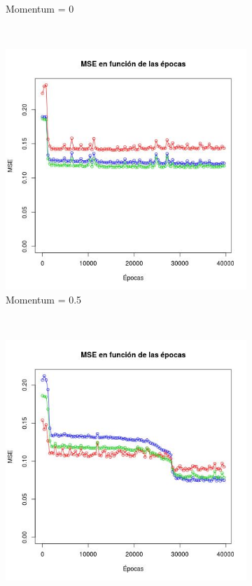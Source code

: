 \documentclass[12pt, a4paper]{article}
\begin{document}
\begin{figure}
\begin{subfigure}[b]{0.45\textwidth}
        \caption{Momentum = 0}
    \end{subfigure}
    ~ %
    \begin{subfigure}[b]{0.45\textwidth}
        \includegraphics[width=\textwidth]{mse22}
        \caption{Momentum = 0.5}
    \end{subfigure}
    ~ %
    \begin{subfigure}[b]{0.45\textwidth}
        \includegraphics[width=\textwidth]{mse22b}

\end{subfigure}
\end{figure}
\end{document}
